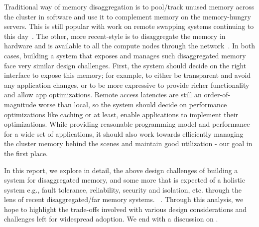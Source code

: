 Traditional way of memory disaggregation is to pool/track  
unused memory across the cluster in software 
and use it to complement memory on the memory-hungry servers.
This is still popular with work on remote swapping systems 
continuing to this day~\cite{infiniswap,fastswap,zswap,leap}.
The other, more recent-style is to disaggregate the memory 
in hardware and is available to all the compute nodes through
the network~\cite{legoos}. In both cases, building a system 
that exposes and manages such disaggregated memory face very 
similar design challenges. First, the system should decide on
the right interface to expose this memory; for example,
to either be transparent and avoid any application changes, 
or to be more expressive to provide richer functionality and 
allow app optimizations. Remote access latencies are still an 
order-of-magnitude worse than local, so the system should 
decide on performance optimizations like caching or at least,
enable applications to implement their optimizations. 
While providing reasonable programming model and performance
for a wide set of applications, it should also work towards 
efficiently managing the cluster memory behind the scenes and 
maintain good utilization - our goal in the first place.

In this report, we explore in detail, the above design 
challenges of building a system for disaggregated memory, 
and some more that is expected of a holistic system e.g., 
fault tolerance, reliability, security and isolation, etc.
through the lens of recent disaggregated/far memory systems.
~\cite{infiniswap,zswap,leap,fastswap,legoos,kona,aifm,semeru,
remregions,literdma}. Through this analysis, we hope to 
highlight the trade-offs involved with various design 
considerations and challenges left for widespread adoption.
We end with a discussion on \todo{}.

